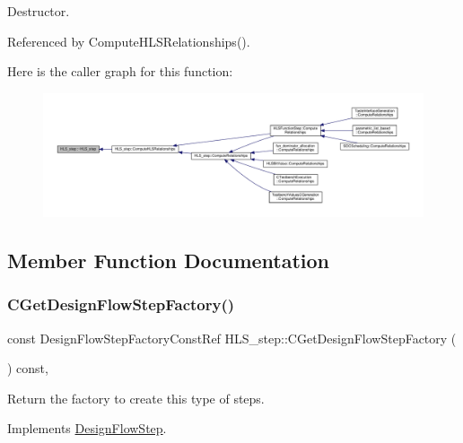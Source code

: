 Destructor. 



Referenced by Compute\+H\+L\+S\+Relationships().

Here is the caller graph for this function\+:
\nopagebreak
\begin{figure}[H]
\begin{center}
\leavevmode
\includegraphics[width=350pt]{da/d27/classHLS__step_a2e2ee25d502e48f0766f538f23def09b_icgraph}
\end{center}
\end{figure}


\subsection{Member Function Documentation}
\mbox{\label{classHLS__step_a4c959ad5e9f100d5f0b0dd64b9883cd7}} 
\subsubsection{\texorpdfstring{C\+Get\+Design\+Flow\+Step\+Factory()}{CGetDesignFlowStepFactory()}}
{\footnotesize\ttfamily const Design\+Flow\+Step\+Factory\+Const\+Ref H\+L\+S\+\_\+step\+::\+C\+Get\+Design\+Flow\+Step\+Factory (\begin{DoxyParamCaption}{ }\end{DoxyParamCaption}) const\hspace{0.3cm}{\ttfamily [override]}, {\ttfamily [virtual]}}



Return the factory to create this type of steps. 



Implements \hyperlink{classDesignFlowStep_a5510a8d296670a07f6b53312c448994c}{Design\+Flow\+Step}.



